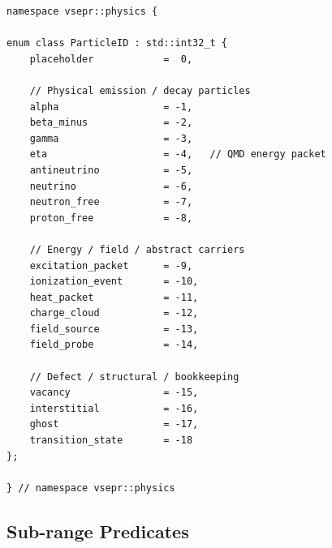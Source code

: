 \documentclass[11pt,a4paper]{article}
\begin{document}
\begin{lstlisting}[style=cpp20,
  caption={\texttt{include/physics/particle\_id.hpp} -- enum class}]
namespace vsepr::physics {

enum class ParticleID : std::int32_t {
    placeholder            =  0,

    // Physical emission / decay particles
    alpha                  = -1,
    beta_minus             = -2,
    gamma                  = -3,
    eta                    = -4,   // QMD energy packet
    antineutrino           = -5,
    neutrino               = -6,
    neutron_free           = -7,
    proton_free            = -8,

    // Energy / field / abstract carriers
    excitation_packet      = -9,
    ionization_event       = -10,
    heat_packet            = -11,
    charge_cloud           = -12,
    field_source           = -13,
    field_probe            = -14,

    // Defect / structural / bookkeeping
    vacancy                = -15,
    interstitial           = -16,
    ghost                  = -17,
    transition_state       = -18
};

} // namespace vsepr::physics
\end{lstlisting}

\subsection{Sub-range Predicates}
\end{document}
